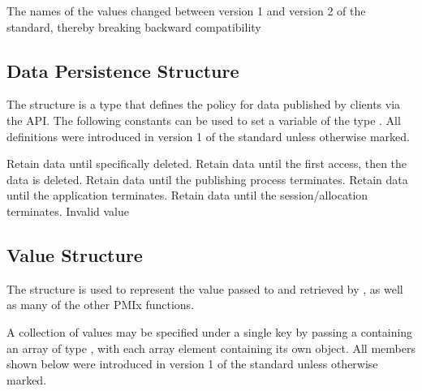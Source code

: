 \adviceuserstart
The names of the  values changed between version 1 and version 2 of the standard, thereby breaking backward compatibility
\adviceuserend

\subsection{Data Persistence Structure}

The  structure is a  type that defines the policy for data published by clients via the  \ac{API}.
The following constants can be used to set a variable of the type . All definitions were introduced in version 1 of the standard unless otherwise marked.

\begin{constantdesc}
%
Retain data until specifically deleted.
%
Retain data until the first access, then the data is deleted.
%
Retain data until the publishing process terminates.
%
Retain data until the application terminates.
%
Retain data until the session/allocation terminates.
%
Invalid value
%
\end{constantdesc}

\subsection{Value Structure}

The  structure is used to represent the value passed to  and retrieved by , as well as many of the other \ac{PMIx} functions.

A collection of values may be specified under a single key by passing a  containing an array of type , with each array element containing its own object. All members shown below were introduced in version 1 of the standard unless otherwise marked.

